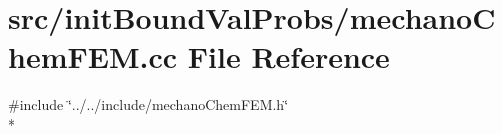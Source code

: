 \section{src/init\-Bound\-Val\-Probs/mechano\-Chem\-F\-E\-M.cc File Reference}
\label{mechano_chem_f_e_m_8cc}
{\ttfamily \#include \char`\"{}../../include/mechano\-Chem\-F\-E\-M.\-h\char`\"{}}\\*
